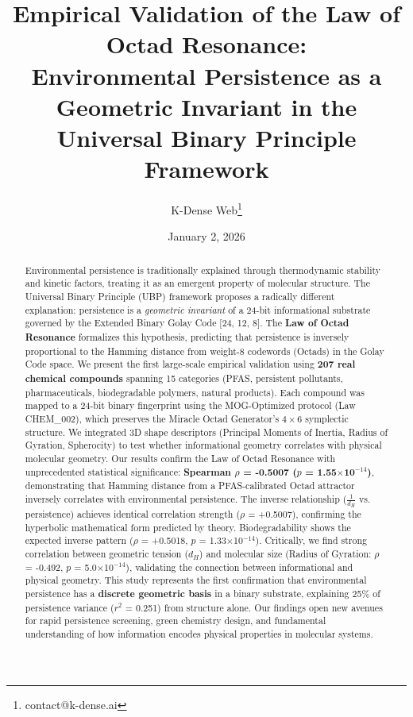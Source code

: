 \documentclass[11pt,letterpaper]{article}
\title{\textbf{Empirical Validation of the Law of Octad Resonance: \\ Environmental Persistence as a Geometric Invariant in the Universal Binary Principle Framework}}
\author{K-Dense Web\thanks{contact@k-dense.ai}}
\date{January 2, 2026}
\begin{document}
\maketitle

\begin{abstract}
\noindent Environmental persistence is traditionally explained through thermodynamic stability and kinetic factors, treating it as an emergent property of molecular structure. The Universal Binary Principle (UBP) framework proposes a radically different explanation: persistence is a \textit{geometric invariant} of a 24-bit informational substrate governed by the Extended Binary Golay Code [24, 12, 8]. The \textbf{Law of Octad Resonance} formalizes this hypothesis, predicting that persistence is inversely proportional to the Hamming distance from weight-8 codewords (Octads) in the Golay Code space. We present the first large-scale empirical validation using \textbf{207 real chemical compounds} spanning 15 categories (PFAS, persistent pollutants, pharmaceuticals, biodegradable polymers, natural products). Each compound was mapped to a 24-bit binary fingerprint using the MOG-Optimized protocol (Law CHEM\_002), which preserves the Miracle Octad Generator's $4\times6$ symplectic structure. We integrated 3D shape descriptors (Principal Moments of Inertia, Radius of Gyration, Spherocity) to test whether informational geometry correlates with physical molecular geometry. Our results confirm the Law of Octad Resonance with unprecedented statistical significance: \textbf{Spearman $\rho$ = -0.5007 ($p$ = 1.55$\times$10$^{-14}$)}, demonstrating that Hamming distance from a PFAS-calibrated Octad attractor inversely correlates with environmental persistence. The inverse relationship ($\frac{1}{d_H}$ vs. persistence) achieves identical correlation strength ($\rho$ = +0.5007), confirming the hyperbolic mathematical form predicted by theory. Biodegradability shows the expected inverse pattern ($\rho$ = +0.5018, $p$ = 1.33$\times$10$^{-14}$). Critically, we find strong correlation between geometric tension ($d_H$) and molecular size (Radius of Gyration: $\rho$ = -0.492, $p$ = 5.0$\times$10$^{-14}$), validating the connection between informational and physical geometry. This study represents the first confirmation that environmental persistence has a \textbf{discrete geometric basis} in a binary substrate, explaining 25\% of persistence variance ($r^2$ = 0.251) from structure alone. Our findings open new avenues for rapid persistence screening, green chemistry design, and fundamental understanding of how information encodes physical properties in molecular systems.
\end{abstract}
\end{document}
